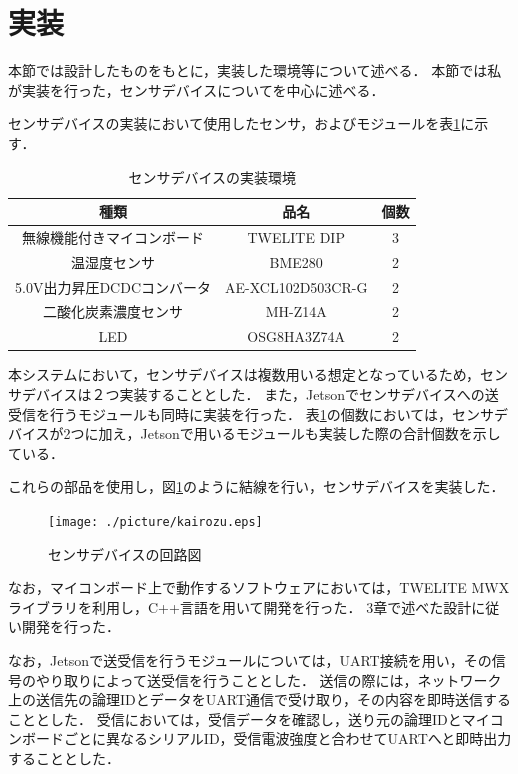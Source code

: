 

\section{実装}

本節では設計したものをもとに，実装した環境等について述べる．
本節では私が実装を行った，センサデバイスについてを中心に述べる．

センサデバイスの実装において使用したセンサ，およびモジュールを表\ref{buhin}に示す．
\begin{table}[htb]
\begin{center}
\caption{センサデバイスの実装環境}
\begin{tabular}{|c|c|c|} \hline
種類 & 品名 & 個数 \\ \hline \hline
無線機能付きマイコンボード & TWELITE DIP & 3 \\
温湿度センサ & BME280 & 2 \\
5.0V出力昇圧DCDCコンバータ & AE-XCL102D503CR-G & 2 \\
二酸化炭素濃度センサ & MH-Z14A & 2 \\
LED & OSG8HA3Z74A & 2\\ \hline
\end{tabular}
\label{buhin}
\end{center}
\end{table}
本システムにおいて，センサデバイスは複数用いる想定となっているため，センサデバイスは２つ実装することとした．
また，Jetsonでセンサデバイスへの送受信を行うモジュールも同時に実装を行った．
表\ref{buhin}の個数においては，センサデバイスが2つに加え，Jetsonで用いるモジュールも実装した際の合計個数を示している．

これらの部品を使用し，図\ref{kairozu}のように結線を行い，センサデバイスを実装した．
\begin{figure}[htbp]
    \centering
    \texttt{[image: ./picture/kairozu.eps]}
    \caption{センサデバイスの回路図}
    \label{kairozu}
\end{figure}

なお，マイコンボード上で動作するソフトウェアにおいては，TWELITE MWXライブラリを利用し，C++言語を用いて開発を行った．
3章で述べた設計に従い開発を行った．

なお，Jetsonで送受信を行うモジュールについては，UART接続を用い，その信号のやり取りによって送受信を行うこととした．
送信の際には，ネットワーク上の送信先の論理IDとデータをUART通信で受け取り，その内容を即時送信することとした．
受信においては，受信データを確認し，送り元の論理IDとマイコンボードごとに異なるシリアルID，受信電波強度と合わせてUARTへと即時出力することとした．



